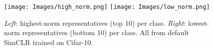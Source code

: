\begin{figure}
    \centering
    \texttt{[image: Images/high\_norm.png]}
    \quad
    \texttt{[image: Images/low\_norm.png]}
    \caption{\emph{Left}: highest-norm representatives (top 10) per class. \emph{Right}: lowest-norm representatives (bottom 10) per class. All from default SimCLR trained on Cifar-10.}
    \label{fig:cifar_norms}
\end{figure}